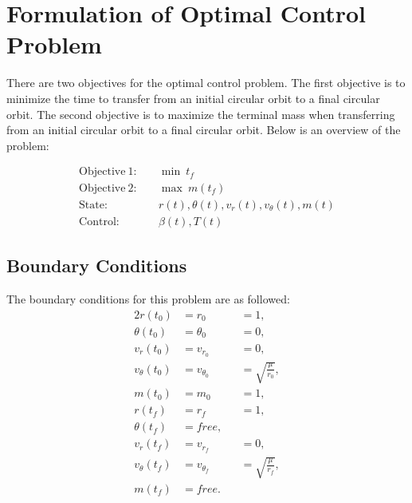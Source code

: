 \documentclass[]{article}
\begin{document}
	\section{Formulation of Optimal Control Problem}
	There are two objectives for the optimal control problem. The first objective is to minimize the time to transfer from an initial circular orbit to a final circular orbit. The second objective is to maximize the terminal mass when transferring from an initial circular orbit to a final circular orbit. Below is an overview of the problem:

	\begin{align*}
		\mathrm{Objective \ 1}:& \quad \min\ t_f \\
		\mathrm{Objective \ 2}:& \quad \max\ m(t_f) \\
		\mathrm{State}:&     \quad r(t), \theta(t), v_r(t), v_\theta(t), m(t) \\
		\mathrm{Control}:&   \quad \beta(t), T(t)
	\end{align*}
	\subsection{Boundary Conditions}
	The boundary conditions for this problem are as followed:
	\begin{alignat*}{2}                                                                                                                                                                        
		r(t_0)          &= r_0          &  &= 1, \\
		\theta(t_0)     &= \theta_0     &  &= 0, \\
		v_r(t_0)        &= v_{r_0}      &  &= 0, \\
		v_{\theta}(t_0) &= v_{\theta_0} &  &= \sqrt{\frac{\mu}{r_0}}, \\
		m(t_0)          &= m_0          &  &= 1,\\
		r(t_f)          &= r_f          &  &= 1,\\
		\theta(t_f)     &= free,        &  & \\
		v_r(t_f)        &= v_{r_f}      &  &= 0, \\
		v_{\theta}(t_f) &= v_{\theta_f} &  &=\sqrt{\frac{\mu}{r_f}},\\
		m(t_f)          &= free.         &  & 
	\end{alignat*}
\end{document}
